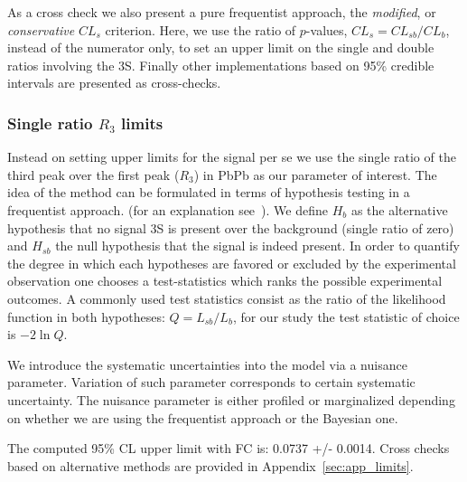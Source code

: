  As a cross check we also present a pure frequentist approach, the \textit{modified}, or \textit{conservative} $CL_s$ criterion. Here, we use the ratio of $p$-values, $CL_{s}=CL_{sb}/CL_{b}$, instead of the numerator only, to set an upper limit on the single and double ratios involving the 3S.  Finally other implementations based on 95\% credible intervals are presented as cross-checks.

\subsubsection{Single ratio $R_{3}$ limits}
Instead on setting upper limits for the \PgUc signal per se we use the single ratio of the third peak over the first peak ($R_{3}$) in PbPb as our parameter of interest. The idea of the method can be formulated in terms of hypothesis testing in a frequentist approach.  (for an explanation see~\cite{alexread}).  
We define $H_b$ as the alternative hypothesis that no signal 3S is present over the background (single ratio of zero) and $H_{sb}$ the null hypothesis that the signal is indeed present. In order to quantify the degree in which each hypotheses
are favored or excluded by the experimental observation one chooses a
test-statistics which ranks the possible experimental outcomes. A
commonly used test statistics consist as the ratio of the likelihood
function in both hypotheses: $Q=L_{sb}/L_b$, for our study the test statistic of choice is $-2\ln Q$. 

We introduce the systematic uncertainties into the model via a nuisance parameter. Variation of such parameter corresponds to certain systematic uncertainty. The nuisance parameter is either profiled or marginalized depending on whether we are using the frequentist approach or the Bayesian one. 

The computed 95\% CL upper limit with FC is: 0.0737 +/- 0.0014.
Cross checks based on alternative methods are provided in Appendix~\ref{sec:app_limits}. 


